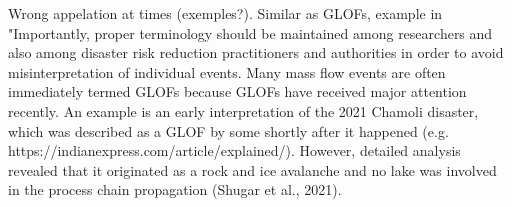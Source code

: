 


Wrong appelation at times (exemples?). Similar as GLOFs, example in \cite{Emmer&al2022} "Importantly, proper terminology should be maintained among researchers and also among disaster risk reduction practitioners and authorities in order to avoid misinterpretation of individual events. Many mass flow events are often immediately termed GLOFs because GLOFs have received major attention recently. An example is an early interpretation of the 2021 Chamoli disaster, which was described as a GLOF by some shortly after it happened (e.g. https://indianexpress.com/article/explained/). However, detailed analysis revealed that it originated as a rock and ice avalanche and no lake was involved in the process chain propagation (Shugar et al., 2021).






